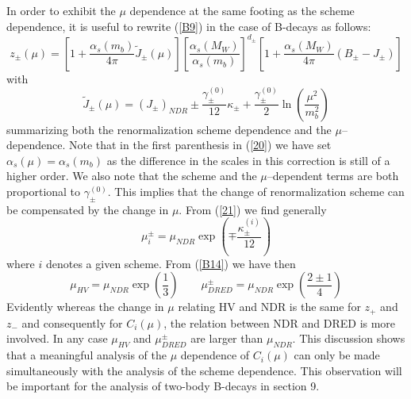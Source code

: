 \documentclass[12pt]{article}
\begin{document}
\begin{itemize}
\begin{itemize}
In order to exhibit the $\mu$ dependence at the same footing as the
scheme dependence, it is useful to rewrite (\ref{B9}) in the case
of B-decays as follows:
\begin{equation}\label{20}
z_\pm(\mu)=\left[1+\frac{\alpha_s(m_b)}{4\pi} \tilde J_\pm(\mu)\right]
      \left[\frac{\alpha_s(M_W)}{\alpha_s(m_b)}\right]^{d_\pm}
\left[1+\frac{\alpha_s(M_W)}{4\pi}(B_\pm-J_\pm)\right]
\end{equation}
with 
\begin{equation}\label{21}
\tilde J_\pm(\mu)=(J_\pm)_{NDR}\pm 
\frac{\gamma^{(0)}_\pm}{12}\kappa_\pm
+\frac{\gamma^{(0)}_\pm}{2}\ln(\frac{\mu^2}{m^2_b})
\end{equation}
summarizing both the renormalization scheme dependence and the 
$\mu$--dependence. Note that in the first parenthesis in (\ref{20}) 
we have
set $\alpha_s(\mu)=\alpha_s(m_b)$ as the difference in the
scales in this correction is still of a higher order.
We also note that the scheme and the $\mu$--dependent terms
are both proportional to $\gamma^{(0)}_\pm$. This implies that the
change of renormalization scheme can be compensated by the change
in $\mu$. From (\ref{21}) we find generally
\begin{equation}\label{21a}
\mu_i^\pm=\mu_{NDR}\exp\left(\mp\frac{\kappa_\pm^{(i)}}{12}\right)
\end{equation}
where $i$ denotes a given scheme. From (\ref{B14}) we have then
\begin{equation}\label{22}
\mu_{HV}=\mu_{NDR}\exp\left(\frac{1}{3}\right)
\qquad
\mu_{DRED}^{\pm}=
\mu_{NDR}\exp\left(\frac{2\pm 1}{4}\right)
\end{equation}
Evidently whereas the change in $\mu$ relating HV and NDR is the
same for $z_+$ and $z_-$ and consequently for 
$C_i(\mu)$, the relation between NDR and DRED is more involved. In any
case $\mu_{HV}$ and $\mu_{DRED}^\pm$ are larger than $\mu_{NDR}$. 
This discussion shows that a meaningful analysis of the $\mu$
dependence of $C_i(\mu)$ can only be made simultaneously with the
analysis of the scheme dependence. This observation will be important
for the analysis of two-body B-decays in section 9.


\end{itemize}
\end{itemize}
\end{document}
